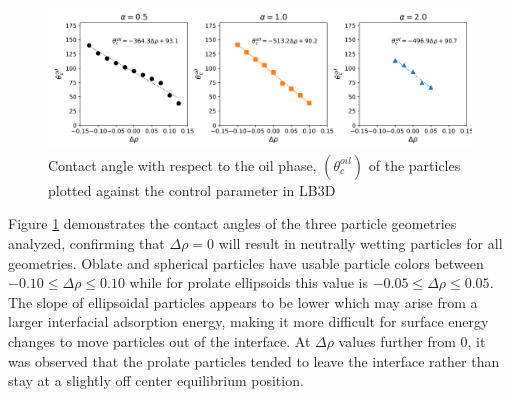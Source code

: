 \begin{figure}[h]
    \centering
    \includegraphics[scale = 0.5]{figures/model_validation/contact_angle_compare.png}
    \caption{Contact angle with respect to the oil phase, $(\theta_c^{oil})$ of the particles plotted against the control parameter in LB3D}
    \label{fig:contact_angle_valid}
\end{figure}

Figure \ref{fig:contact_angle_valid} demonstrates the contact angles of the three particle geometries analyzed, confirming that $\Delta \rho = 0$ will result in neutrally wetting particles for all geometries. Oblate and spherical particles have usable particle colors between $-0.10 \leq \Delta \rho \leq 0.10$ while for prolate ellipsoids this value is $-0.05 \leq \Delta \rho \leq 0.05$. The slope of ellipsoidal particles appears to be lower which may arise from a larger interfacial adsorption energy, making it more difficult for surface energy changes to move particles out of the interface. At $\Delta \rho$ values further from 0, it was observed that the prolate particles tended to leave the interface rather than stay at a slightly off center equilibrium position. 